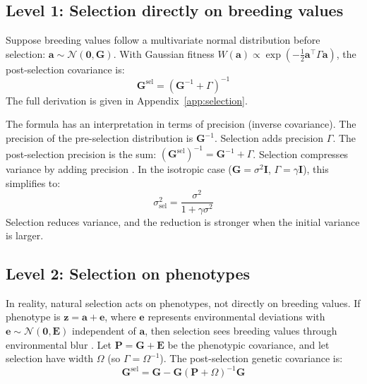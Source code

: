 \documentclass[9pt,twocolumn,twoside,lineno]{gsajnl}
\newcommand{\vect}[1]{\boldsymbol{#1}}
\newcommand{\mat}[1]{\mathbf{#1}}
\newcommand{\Gsel}{\ensuremath{\mat{G}^{\text{sel}}}\xspace}
\begin{document}
\subsection{Level 1: Selection directly on breeding values}
\label{sec:level1}

Suppose breeding values follow a multivariate normal distribution before selection: $\vect{a} \sim \mathcal{N}(\vect{0}, \mat{G})$. With Gaussian fitness $W(\vect{a}) \propto \exp(-\tfrac{1}{2}\vect{a}^\top \Gamma \vect{a})$, the post-selection covariance is:
\begin{equation}
\Gsel = (\mat{G}^{-1} + \Gamma)^{-1}
\label{eq:level1}
\end{equation}
The full derivation is given in Appendix~\ref{app:selection}.

The formula has an interpretation in terms of precision (inverse covariance). The precision of the pre-selection distribution is $\mat{G}^{-1}$. Selection adds precision $\Gamma$. The post-selection precision is the sum: $(\Gsel)^{-1} = \mat{G}^{-1} + \Gamma$. Selection compresses variance by adding precision \citep{Lande1980, Bulmer1971, Bulmer1980, BartonTurelli1991}. In the isotropic case ($\mat{G} = \sigma^2 \mat{I}$, $\Gamma = \gamma \mat{I}$), this simplifies to:
\begin{equation}
\sigma^2_{\text{sel}} = \frac{\sigma^2}{1 + \gamma \sigma^2}
\label{eq:level1-scalar}
\end{equation}
Selection reduces variance, and the reduction is stronger when the initial variance is larger.

\subsection{Level 2: Selection on phenotypes}

In reality, natural selection acts on phenotypes, not directly on breeding values. If phenotype is $\vect{z} = \vect{a} + \vect{e}$, where $\vect{e}$ represents environmental deviations with $\vect{e} \sim \mathcal{N}(\vect{0}, \mat{E})$ independent of $\vect{a}$, then selection sees breeding values through environmental blur \citep{Lynch1998}. Let $\mat{P} = \mat{G} + \mat{E}$ be the phenotypic covariance, and let selection have width $\Omega$ (so $\Gamma = \Omega^{-1}$). The post-selection genetic covariance is:
\begin{equation}
\Gsel = \mat{G} - \mat{G}(\mat{P} + \Omega)^{-1}\mat{G}
\label{eq:level2}
\end{equation}
\end{document}
